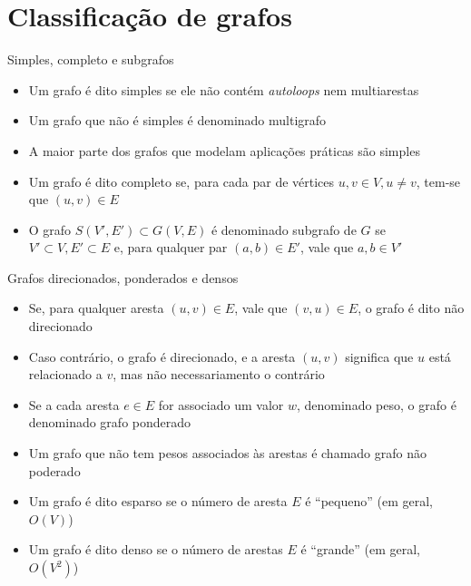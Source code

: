 \section{Classificação de grafos}

\begin{frame}[fragile]{Simples, completo e subgrafos}

    \begin{itemize}
        \item Um grafo é dito simples se ele não contém \textit{autoloops} nem multiarestas

        \item Um grafo que não é simples é denominado multigrafo

        \item A maior parte dos grafos que modelam aplicações práticas são simples

        \item Um grafo é dito completo se, para cada par de vértices $u, v \in V, u \neq v$, 
            tem-se que $(u, v)\in E$

        \item O grafo $S(V', E') \subset G(V, E)$ é denominado subgrafo de $G$ se $V'\subset V,
            E'\subset E$ e, para qualquer par $(a, b)\in E'$, vale que $a, b \in V'$
    \end{itemize}

\end{frame}



\begin{frame}[fragile]{Grafos direcionados, ponderados e densos}

    \begin{itemize}
        \item Se, para qualquer aresta $(u, v)\in E$, vale que $(v, u)\in E$, o grafo é dito
            não direcionado

        \item Caso contrário, o grafo é direcionado, e a aresta $(u, v)$ significa que $u$ está
            relacionado a $v$, mas não necessariamento o contrário

        \item Se a cada aresta $e\in E$ for associado um valor $w$, denominado peso, o grafo é
            denominado grafo ponderado

        \item Um grafo que não tem pesos associados às arestas é chamado grafo não poderado

        \item Um grafo é dito esparso se o número de aresta $E$ é ``pequeno'' (em geral, $O(V)$)

        \item Um grafo é dito denso se o número de arestas $E$ é ``grande'' (em geral, $O(V^2)$)
    \end{itemize}

\end{frame}

